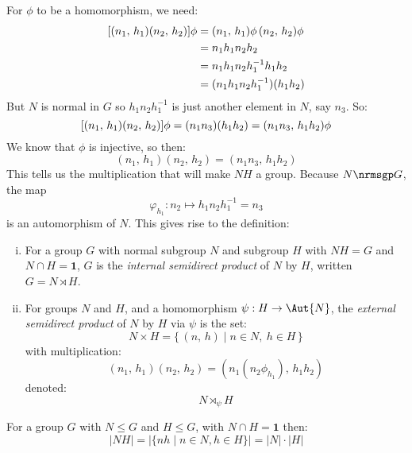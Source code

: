 For \(\phi\) to be a homomorphism, we need:
\begin{equation*}
\begin{aligned}
    \relax[(n_1,\,h_1)(n_2,\,h_2)]\phi &= (n_1,\,h_1)\phi\,(n_2,\,h_2)\phi \\
    &= n_1 h_1 n_2 h_2 \\
    &= n_1 h_1 n_2 h_1^{-1} h_1 h_2 \\
    &= (n_1 h_1 n_2 h_1^{-1})(h_1 h_2)
\end{aligned}
\end{equation*}
But \(N\) is normal in \(G\) so \(h_1 n_2 h_1^{-1}\) is just another element in \(N\), say \(n_3\).
So:
\[\relax[(n_1,\,h_1)(n_2,\,h_2)]\phi = (n_1 n_3)(h_1 h_2) = (n_1 n_3,\,h_1 h_2)\phi\]
We know that \(\phi\) is injective, so then:
\[(n_1,\,h_1)(n_2,\,h_2) = (n_1 n_3,\,h_1 h_2)\]
This tells us the multiplication that will make \(NH\) a group.
Because \(N \nrmsgp G\), the map
\[\varphi_{h_1}:n_2 \mapsto h_1 n_2 h_1^{-1} = n_3\]
is an automorphism of \(N\).
This gives rise to the definition:

\begin{definition}
\mbox{}
\begin{enumerate}[(i)]
    \item

        For a group \(G\) with normal subgroup \(N\) and subgroup \(H\) with \(NH = G\) and \(N \cap H = \bm{1}\),
        \(G\) is the \emph{internal semidirect product} of \(N\) by \(H\), written \(G = N \rtimes H\).

    \item

        For groups \(N\) and \(H\), and a homomorphism \(\psi:H \to \Aut{N}\), the \emph{external semidirect product} of
        \(N\) by \(H\) via \(\psi\) is the set:
        \[N \times H = \{\,(n,\,h) \mid n \in N,\ h \in H\,\}\]
        with multiplication:
        \[(n_1,\,h_1)(n_2,\,h_2) = (n_1(n_2\phi_{h_1}),\,h_1 h_2)\]
        denoted:
        \[N \rtimes_{\psi} H\]

\end{enumerate}
\end{definition}

\begin{lemma}\label{lem:setprodorder}
    For a group \(G\) with \(N \leqslant G\) and \(H \leqslant G\), with \(N \cap H = \bm{1}\) then:
    \[|NH| = |\{nh \mid n \in N, h \in H\}| = |N| \cdot |H|\]
\end{lemma}

